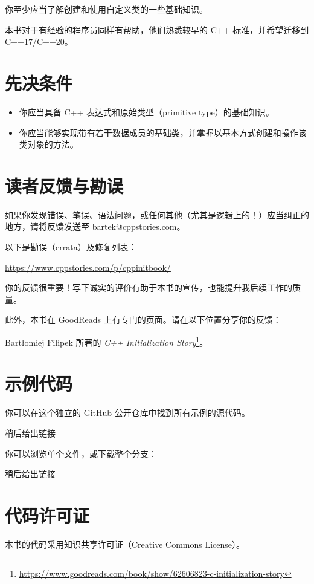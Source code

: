 你至少应当了解创建和使用自定义类的一些基础知识。

本书对于有经验的程序员同样有帮助，他们熟悉较早的 C++ 标准，并希望迁移到 C++17/C++20。

\section{先决条件}

\begin{itemize}
\item 你应当具备 C++ 表达式和原始类型（primitive type）的基础知识。
\item 你应当能够实现带有若干数据成员的基础类，并掌握以基本方式创建和操作该类对象的方法。
\end{itemize}

\section{读者反馈与勘误}

如果你发现错误、笔误、语法问题，或任何其他（尤其是逻辑上的！）应当纠正的地方，请将反馈发送至 bartek@cppstories.com。

以下是勘误（errata）及修复列表：

\url{https://www.cppstories.com/p/cppinitbook/}

你的反馈很重要！写下诚实的评价有助于本书的宣传，也能提升我后续工作的质量。

此外，本书在 GoodReads 上有专门的页面。请在以下位置分享你的反馈：

Bartłomiej Filipek 所著的 \emph{C++ Initialization Story}\footnote{\url{https://www.goodreads.com/book/show/62606823-c-initialization-story}}。

\section{示例代码}

你可以在这个独立的 GitHub 公开仓库中找到所有示例的源代码。

稍后给出链接

你可以浏览单个文件，或下载整个分支：

稍后给出链接

\section{代码许可证}

本书的代码采用知识共享许可证（Creative Commons License）。


